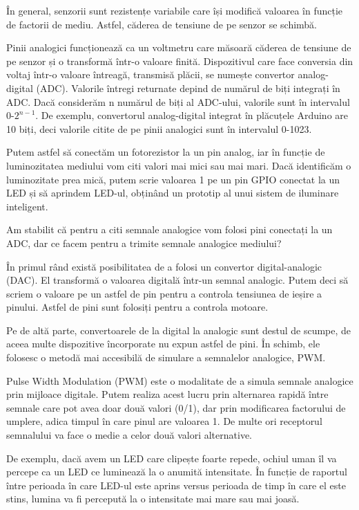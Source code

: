 În general, senzorii sunt rezistențe variabile care își modifică valoarea în
funcție de factorii de mediu. Astfel, căderea de tensiune de pe senzor se
schimbă.

Pinii analogici funcționează ca un voltmetru care măsoară căderea de tensiune de
pe senzor și o transformă într-o valoare finită. Dispozitivul care face
conversia din voltaj într-o valoare întreagă, transmisă plăcii, se numește
convertor analog-digital (ADC). Valorile întregi returnate depind de numărul de
biți integrați în ADC. Dacă considerăm n numărul de biți al ADC-ului, valorile
sunt în intervalul 0-$2^{n-1}$. De exemplu, convertorul analog-digital integrat în
plăcuțele Arduino are 10 biți, deci valorile citite de pe pinii analogici sunt
în intervalul 0-1023.

Putem astfel să conectăm un fotorezistor la un pin analog, iar în funcție de
luminozitatea mediului vom citi valori mai mici sau mai mari. Dacă identificăm o
luminozitate prea mică, putem scrie valoarea 1 pe un pin GPIO conectat la un LED
și să aprindem LED-ul, obținând un prototip al unui sistem de iluminare
inteligent.

Am stabilit că pentru a citi semnale analogice vom folosi pini conectați la un
ADC, dar ce facem pentru a trimite semnale analogice mediului?

În primul rând există posibilitatea de a folosi un convertor digital-analogic
(DAC). El transformă o valoarea digitală într-un semnal analogic. Putem deci să
scriem o valoare pe un astfel de pin pentru a controla tensiunea de ieșire a
pinului. Astfel de pini sunt folosiți pentru a controla motoare.

Pe de altă parte, convertoarele de la digital la analogic sunt destul de scumpe,
de aceea multe dispozitive încorporate nu expun astfel de pini. În schimb, ele
folosesc o metodă mai accesibilă de simulare a semnalelor analogice, PWM.

Pulse Width Modulation (PWM) este o modalitate de a simula semnale analogice
prin mijloace digitale. Putem realiza acest lucru prin alternarea rapidă între
semnale care pot avea doar două valori (0/1), dar prin modificarea factorului de
umplere, adica timpul în care pinul are valoarea 1. De multe ori receptorul
semnalului va face o medie a celor două valori alternative.

De exemplu, dacă avem un LED care clipește foarte repede, ochiul uman îl va
percepe ca un LED ce luminează la o anumită intensitate. În funcție de raportul
între perioada în care LED-ul este aprins versus perioada de timp în care el
este stins, lumina va fi percepută la o intensitate mai mare sau mai joasă.

